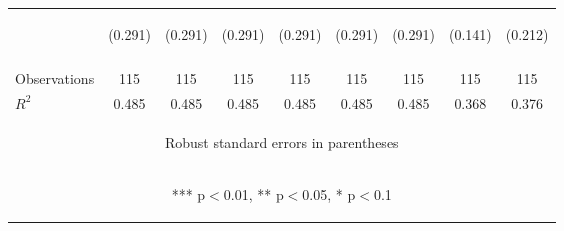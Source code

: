 \begin{center}
\begin{tabular}{lcccccccc}
 & \begin{footnotesize}(0.291)\end{footnotesize} & \begin{footnotesize}(0.291)\end{footnotesize} & \begin{footnotesize}(0.291)\end{footnotesize} & \begin{footnotesize}(0.291)\end{footnotesize} & \begin{footnotesize}(0.291)\end{footnotesize} & \begin{footnotesize}(0.291)\end{footnotesize} & \begin{footnotesize}(0.141)\end{footnotesize} & \begin{footnotesize}(0.212)\end{footnotesize} \\
\vspace{4pt} & \begin{footnotesize}\end{footnotesize} & \begin{footnotesize}\end{footnotesize} & \begin{footnotesize}\end{footnotesize} & \begin{footnotesize}\end{footnotesize} & \begin{footnotesize}\end{footnotesize} & \begin{footnotesize}\end{footnotesize} & \begin{footnotesize}\end{footnotesize} & \begin{footnotesize}\end{footnotesize} \\
Observations & 115 & 115 & 115 & 115 & 115 & 115 & 115 & 115 \\
 $R^2$ & 0.485 & 0.485 & 0.485 & 0.485 & 0.485 & 0.485 & 0.368 & 0.376 \\ \hline
\multicolumn{9}{c}{\begin{footnotesize} Robust standard errors in parentheses\end{footnotesize}} \\
\multicolumn{9}{c}{\begin{footnotesize} *** p$<$0.01, ** p$<$0.05, * p$<$0.1\end{footnotesize}} \\
\end{tabular}
\end{center}
